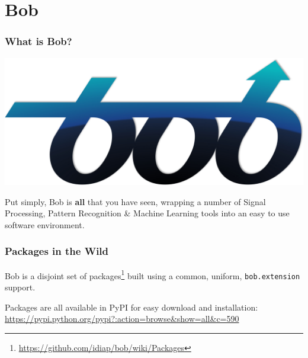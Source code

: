 %
\section{Bob}

\begin{frame}
  \frametitle{What is Bob?}

  \begin{center}
    \includegraphics[width=0.7\linewidth]{graphics/bob}
  \end{center}

  \vspace{2em}

  Put simply, Bob is \textbf{all} that you have seen, wrapping a number of
  Signal Processing, Pattern Recognition \& Machine Learning tools into an easy
  to use software environment.

\end{frame}


\begin{frame}
  \frametitle{Packages in the Wild}

  Bob is a disjoint set of
  packages\footnote{\url{https://github.com/idiap/bob/wiki/Packages}} built
  using a common, uniform, \texttt{bob.extension} support.

  \vspace{2em}

  Packages are all available in PyPI for easy download and installation:
  \url{https://pypi.python.org/pypi?:action=browse&show=all&c=590}



\end{frame}


